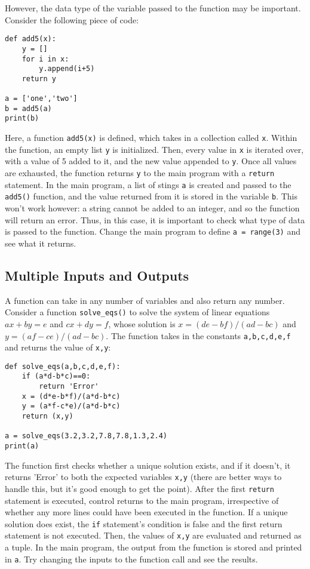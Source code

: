 \documentclass[12pt]{article}
\newcommand{\code}{\texttt}
\begin{document}
However, the data type of the variable passed to the function may be important. Consider the following piece of code:

\begin{lstlisting}[frame=single] 
def add5(x):
    y = []
    for i in x:
        y.append(i+5)
    return y

a = ['one','two']
b = add5(a)
print(b)
\end{lstlisting}

Here, a function \code{add5(x)} is defined, which takes in a collection called \code{x}. Within the function, an empty list \code{y} is initialized. Then, every value in \code{x} is iterated over, with a value of 5 added to it, and the new value appended to \code{y}. Once all values are exhausted, the function returns \code{y} to the main program with a \code{return} statement. In the main program, a list of stings \code{a} is created and passed to the \code{add5()} function, and the value returned from it is stored in the variable \code{b}. This won't work however: a string cannot be added to an integer, and so the function will return an error. Thus, in this case, it is important to check what type of data is passed to the function. Change the main program to define \code{a = range(3)} and see what it returns. 

\subsection{Multiple Inputs and Outputs}

A function can take in any number of variables and also return any number. Consider a function \code{solve\_eqs()} to solve the system of linear equations $ax+by=e$ and $cx+dy=f$, whose solution is $x=(de-bf)/(ad-bc)$ and $y=(af-ce)/(ad-bc)$. The function takes in the constants \code{a,b,c,d,e,f} and returns the value of \code{x,y}:

\begin{lstlisting}[frame=single] 
def solve_eqs(a,b,c,d,e,f):
    if (a*d-b*c)==0:
        return 'Error'
    x = (d*e-b*f)/(a*d-b*c)
    y = (a*f-c*e)/(a*d-b*c)
    return (x,y)

a = solve_eqs(3.2,3.2,7.8,7.8,1.3,2.4)
print(a)
\end{lstlisting}

The function first checks whether a unique solution exists, and if it doesn't, it returns 'Error' to both the expected variables \code{x,y} (there are better ways to handle this, but it's good enough to get the point). After the first \code{return} statement is executed, control returns to the main program, irrespective of whether any more lines could have been executed in the function. If a unique solution does exist, the \code{if} statement's condition is false and the first return statement is not executed. Then, the values of \code{x,y} are evaluated and returned as a tuple. In the main program, the output from the function is stored and printed in \code{a}. Try changing the inputs to the function call and see the results.
\end{document}
